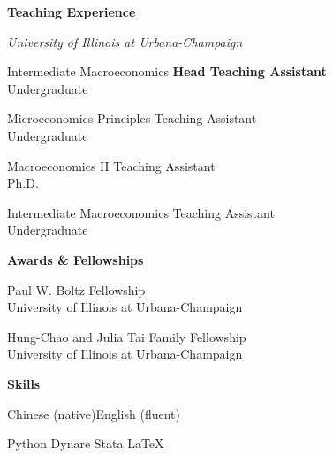 \documentclass[12pt, letterpaper]{article}
\newlength{\labelcol}
\newcommand{\cvsection}[1]{%
  \vspace{13pt}%
  {\large\bfseries\color{accent} #1}%
  \par\vspace{5pt}%
}
\newcommand{\cvrow}[3]{%
  \noindent%
  \makebox[\labelcol][l]{#1{#2}}%
  \begin{minipage}[t]{\dimexpr\linewidth-\labelcol\relax}%
    \raggedright #3%
  \end{minipage}%
  \par\vspace{3.5pt}%
}
\newcommand{\entry}[2]{\cvrow{\small\color{muted}}{#1}{#2}}
\newcommand{\labelrow}[2]{\cvrow{\small\itshape\color{muted}}{#1}{#2}}
\begin{document}
\cvsection{Teaching Experience}

{\small\itshape\color{muted}University of Illinois at Urbana-Champaign}

\vspace{6pt}

\entry{FA25}{%
  Intermediate Macroeconomics \hfill \textbf{Head Teaching Assistant}\\
  {\small\color{muted}Undergraduate}}

\entry{SP26, SP25, FA24}{%
  Microeconomics Principles \hfill Teaching Assistant\\
  {\small\color{muted}Undergraduate}}

\entry{SP24}{%
  Macroeconomics II \hfill Teaching Assistant\\
  {\small\color{muted}Ph.D.}}

\entry{FA23}{%
  Intermediate Macroeconomics \hfill Teaching Assistant\\
  {\small\color{muted}Undergraduate}}

\cvsection{Awards \& Fellowships}

\entry{2026}{%
  Paul W. Boltz Fellowship\\
  {\small\color{muted}University of Illinois at Urbana-Champaign}}

\entry{2025}{%
  Hung-Chao and Julia Tai Family Fellowship\\
  {\small\color{muted}University of Illinois at Urbana-Champaign}}

\cvsection{Skills}

\labelrow{Languages}{Chinese (native)\enspace\textbullet\enspace English (fluent)}

\labelrow{Computing}{%
  Python \enspace\textbullet\enspace
  Dynare \enspace\textbullet\enspace
  Stata \enspace\textbullet\enspace
  \LaTeX}
\end{document}
